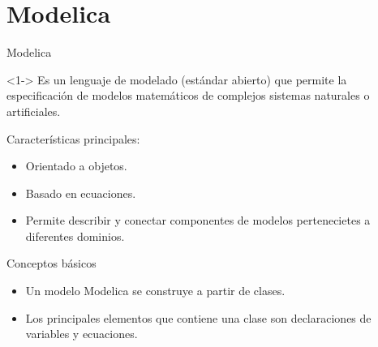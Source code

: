 \section{Modelica}

\begin{frame}{Modelica}
    \begin{block}<1->{}
        Es un lenguaje de modelado (estándar abierto) que permite la especificación de modelos matemáticos de complejos sistemas naturales o artificiales.
    \end{block}
    Características principales:
    \begin{itemize}
        \item<2-> Orientado a objetos.
        \item<3-> Basado en ecuaciones.
        \item<4-> Permite describir y conectar componentes de modelos pertenecietes a diferentes dominios.
    \end{itemize}
\end{frame}

\begin{frame}{Conceptos básicos}
    \begin{itemize}
        \item<1-> Un modelo Modelica se construye a partir de clases.
        \item<2-> Los principales elementos que contiene una clase  son declaraciones de variables y ecuaciones.
    \end{itemize}
\end{frame}

